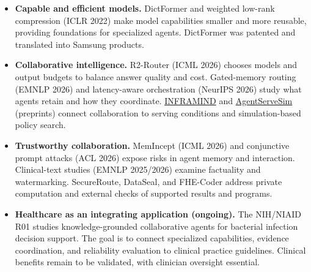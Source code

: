 \begin{itemize}
\item \textbf{Capable and efficient models.} DictFormer and weighted low-rank compression (ICLR 2022) make model capabilities smaller and more reusable, providing foundations for specialized agents. DictFormer was patented and translated into Samsung products.
\item \textbf{Collaborative intelligence.} R2-Router (ICML 2026) chooses models and output budgets to balance answer quality and cost. Gated-memory routing (EMNLP 2026) and latency-aware orchestration (NeurIPS 2026) study what agents retain and how they coordinate. \href{https://arxiv.org/pdf/2606.11440}{INFRAMIND} and \href{https://arxiv.org/pdf/2606.09613}{AgentServeSim} (preprints) connect collaboration to serving conditions and simulation-based policy search.
\item \textbf{Trustworthy collaboration.} MemIncept (ICML 2026) and conjunctive prompt attacks (ACL 2026) expose risks in agent memory and interaction. Clinical-text studies (EMNLP 2025/2026) examine factuality and watermarking. SecureRoute, DataSeal, and FHE-Coder address private computation and external checks of supported results and programs.
\item \textbf{Healthcare as an integrating application (ongoing).} The NIH/NIAID R01 studies knowledge-grounded collaborative agents for bacterial infection decision support. The goal is to connect specialized capabilities, evidence coordination, and reliability evaluation to clinical practice guidelines. Clinical benefits remain to be validated, with clinician oversight essential.
\end{itemize}
